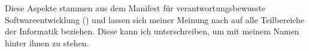 \documentclass[a4paper, 11pt]{scrartcl}
\begin{document}
Diese Aspekte stammen aus dem Manifest für verantwortungsbewusste Softwareentwicklung (\cite{Loewe2015}) und lassen sich meiner Meinung nach auf alle Teilbereiche der Informatik beziehen. Diese kann ich unterschreiben, um mit meinem Namen hinter ihnen zu stehen.

\clearpage
\pagestyle{plain}

\newpage


\printbibliography

















% 

% 
\end{document}
